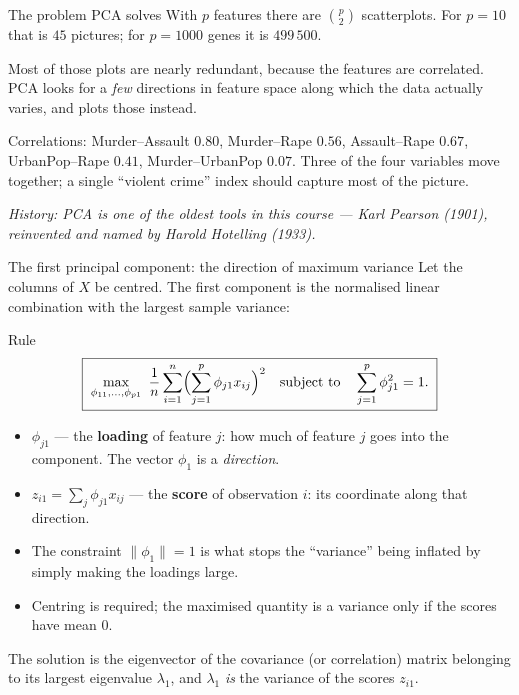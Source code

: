 \documentclass[aspectratio=169,11pt]{beamer}
\begin{document}
\begin{frame}{The problem PCA solves}
  With $p$ features there are $\binom{p}{2}$ scatterplots. For $p=10$ that is $45$
  pictures; for $p=1000$ genes it is $499\,500$.
  \begin{readme}
    Most of those plots are nearly redundant, because the features are correlated. PCA
    looks for a \emph{few} directions in feature space along which the data actually
    varies, and plots those instead.
  \end{readme}
  \begin{numexample}[{{USArrests, $p=4$}}]
    Correlations: Murder--Assault $0.80$, Murder--Rape $0.56$, Assault--Rape $0.67$,
    UrbanPop--Rape $0.41$, Murder--UrbanPop $0.07$. Three of the four variables move
    together; a single ``violent crime'' index should capture most of the picture.
  \end{numexample}
  \par{\tiny\itshape\color{gray}History: PCA is one of the oldest tools
  in this course --- Karl Pearson (1901), reinvented and named by Harold
  Hotelling (1933).}
\end{frame}

\begin{frame}{The first principal component: the direction of maximum variance}
  \scriptsize
  Let the columns of $X$ be centred. The first component is the normalised linear
  combination with the largest sample variance:
  \begin{block}{Rule}
    \[
      \boxed{\;\max_{\phi_{11},\dots,\phi_{p1}}\ \frac{1}{n}\sum_{i=1}^{n}
      \Bigl(\sum_{j=1}^{p}\phi_{j1}x_{ij}\Bigr)^{2}
      \quad\text{subject to}\quad \sum_{j=1}^{p}\phi_{j1}^{2}=1 .\;}
    \]
  \end{block}
  \begin{readme}
    \begin{itemize}
      \item $\phi_{j1}$ --- the \textbf{loading} of feature $j$: how much of feature $j$
            goes into the component. The vector $\phi_1$ is a \emph{direction}.
      \item $z_{i1}=\sum_j \phi_{j1}x_{ij}$ --- the \textbf{score} of observation $i$: its
            coordinate along that direction.
      \item The constraint $\|\phi_1\|=1$ is what stops the ``variance'' being inflated by
            simply making the loadings large.
      \item Centring is required; the maximised quantity is a variance only if the scores
            have mean $0$.
    \end{itemize}
  \end{readme}
  \begin{takeaway}
    The solution is the eigenvector of the covariance (or correlation) matrix belonging to
    its largest eigenvalue $\lambda_1$, and $\lambda_1$ \emph{is} the variance of the
    scores $z_{i1}$.
  \end{takeaway}
\end{frame}
\end{document}
